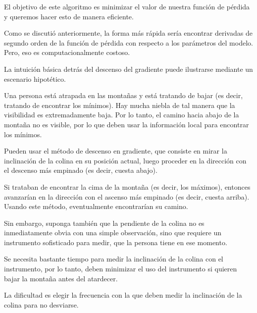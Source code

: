 \documentclass[14.5pt,a4paper]{article}
\begin{document}
El objetivo de este algoritmo es minimizar el valor de nuestra función de pérdida y queremos hacer esto de manera eficiente.

Como se discutió anteriormente, la forma más rápida sería encontrar derivadas de segundo orden de la función de pérdida con respecto a los parámetros del modelo. Pero, eso es computacionalmente costoso.

La intuición básica detrás del descenso del gradiente puede ilustrarse mediante un escenario hipotético.

Una persona está atrapada en las montañas y está tratando de bajar (es decir, tratando de encontrar los mínimos). Hay mucha niebla de tal manera que la visibilidad es extremadamente baja. Por lo tanto, el camino hacia abajo de la montaña no es visible, por lo que deben usar la información local para encontrar los mínimos.

Pueden usar el método de descenso en gradiente, que consiste en mirar la inclinación de la colina en su posición actual, luego proceder en la dirección con el descenso más empinado (es decir, cuesta abajo).

Si trataban de encontrar la cima de la montaña (es decir, los máximos), entonces avanzarían en la dirección con el ascenso más empinado (es decir, cuesta arriba). Usando este método, eventualmente encontrarían su camino.

Sin embargo, suponga también que la pendiente de la colina no es inmediatamente obvia con una simple observación, sino que requiere un instrumento sofisticado para medir, que la persona tiene en ese momento.

Se necesita bastante tiempo para medir la inclinación de la colina con el instrumento, por lo tanto, deben minimizar el uso del instrumento si quieren bajar la montaña antes del atardecer.

La dificultad es elegir la frecuencia con la que deben medir la inclinación de la colina para no desviarse.
\end{document}
